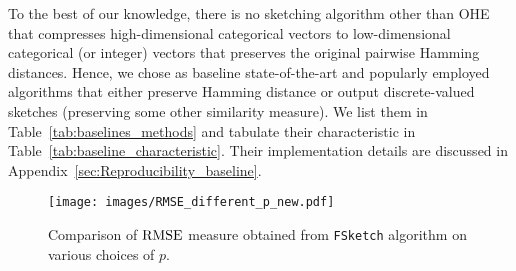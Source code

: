 
To the best of our knowledge, there is no sketching algorithm other than OHE that compresses high-dimensional categorical vectors to low-dimensional categorical (or integer) vectors that preserves the original pairwise Hamming distances. Hence, we chose as baseline state-of-the-art and popularly employed algorithms that either preserve Hamming distance or output discrete-valued sketches (preserving some other similarity measure).  
We list them in Table~\ref{tab:baselines_methods} and  tabulate their characteristic in Table~\ref{tab:baseline_characteristic}. Their implementation details are discussed in Appendix~\ref{sec:Reproducibility_baseline}.




\begin{figure*}
\centering
\texttt{[image: images/RMSE\_different\_p\_new.pdf]}
\caption{{Comparison of $\mathrm{RMSE}$ measure obtained from \texttt{FSketch} algorithm on various choices of  $p$. 
}}
\label{fig:varying_p}
\end{figure*}
 
